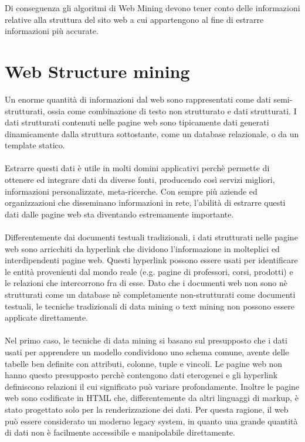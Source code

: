 Di conseguenza gli algoritmi di Web Mining devono tener conto delle informazioni relative alla struttura del sito web a cui appartengono al fine di estrarre informazioni più accurate.
\color{black}
\section{Web Structure mining}
\label{subsec:webstructure}
Un enorme quantità di informazioni dal web sono rappresentati come dati semi-strutturati, ossia come combinazione di testo non strutturato e dati strutturati. I dati strutturati contenuti nelle pagine web sono tipicamente dati generati dinamicamente dalla struttura sottostante, come un database relazionale, o da un template statico.
\\\\
Estrarre questi dati è utile in molti domini applicativi perchè permette di ottenere ed integrare dati da diverse fonti, producendo così servizi migliori, informazioni personalizzate, meta-ricerche. Con sempre più aziende ed organizzazioni che disseminano informazioni in rete, l’abilità di estrarre questi dati dalle pagine web sta diventando estremamente importante.
\\\\
Differentemente dai documenti testuali tradizionali, i dati strutturati nelle pagine web sono arricchiti da hyperlink che dividono l’informazione in molteplici ed interdipendenti pagine web. Questi hyperlink possono essere usati per identificare le entità provenienti dal mondo reale (e.g. pagine di professori, corsi, prodotti) e le relazioni che intercorrono fra di esse. Dato che i documenti web non sono nè strutturati come un database nè completamente non-strutturati come documenti testuali, le tecniche tradizionali di data mining o text mining non possono essere applicate direttamente. 
\\\\
Nel primo caso, le tecniche di data mining si basano sul presupposto che i dati usati per apprendere un modello condividono uno schema comune, avente delle tabelle ben definite con attributi, colonne, tuple e vincoli. Le pagine web non hanno questo presupposto perchè contengono dati eterogenei e gli hyperlink definiscono relazioni il cui significato può variare profondamente. Inoltre le pagine web sono codificate in HTML che, differentemente da altri linguaggi di markup, è stato progettato solo per la renderizzazione dei dati. Per questa ragione, il web può essere considerato un moderno legacy system, in quanto una grande quantità di dati non è facilmente accessibile e manipolabile direttamente. 
